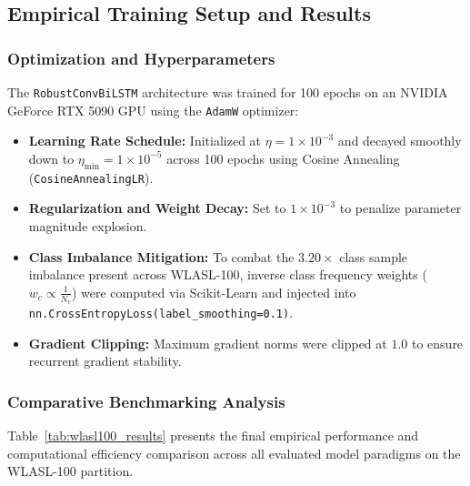 \documentclass[12pt,a4paper]{article}
\begin{document}
\subsection{Empirical Training Setup and Results}

\subsubsection{Optimization and Hyperparameters}
The \texttt{RobustConvBiLSTM} architecture was trained for 100 epochs on an NVIDIA GeForce RTX 5090 GPU using the \texttt{AdamW} optimizer:
\begin{itemize}
    \item \textbf{Learning Rate Schedule:} Initialized at $\eta = 1 \times 10^{-3}$ and decayed smoothly down to $\eta_{\text{min}} = 1 \times 10^{-5}$ across 100 epochs using Cosine Annealing (\texttt{CosineAnnealingLR}).
    \item \textbf{Regularization and Weight Decay:} Set to $1 \times 10^{-3}$ to penalize parameter magnitude explosion.
    \item \textbf{Class Imbalance Mitigation:} To combat the $3.20\times$ class sample imbalance present across WLASL-100, inverse class frequency weights ($w_c \propto \frac{1}{N_c}$) were computed via Scikit-Learn and injected into \texttt{nn.CrossEntropyLoss(label\_smoothing=0.1)}.
    \item \textbf{Gradient Clipping:} Maximum gradient norms were clipped at $1.0$ to ensure recurrent gradient stability.
\end{itemize}

\subsubsection{Comparative Benchmarking Analysis}
Table~\ref{tab:wlasl100_results} presents the final empirical performance and computational efficiency comparison across all evaluated model paradigms on the WLASL-100 partition.

\begin{table}[htbp]
\centering
\small
\caption{Empirical Benchmark and Computational Efficiency Comparison on WLASL-100}
\label{tab:wlasl100_results}
\end{table}
\end{document}
